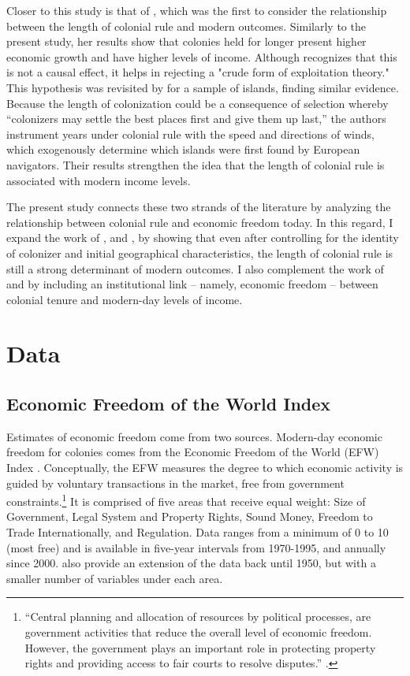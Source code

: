\documentclass[a4paper,12pt]{article}
\begin{document}
Closer to this study is that of \cite{grier1999colonial}, which was the first to consider the relationship between the length of colonial rule and modern outcomes. Similarly to the present study, her results show that colonies held for longer present higher economic growth and have higher levels of income. Although \cite{grier1999colonial} recognizes that this is not a causal effect, it helps in rejecting a "crude form of exploitation theory." This hypothesis was revisited by \cite{feyrer2009colonialism} for a sample of islands, finding similar evidence. Because the length of colonization could be a consequence of selection whereby ``colonizers may settle the best places first and give them up last,'' the authors instrument years under colonial rule with the speed and directions of winds, which exogenously determine which islands were first found by European navigators. Their results strengthen the idea that the length of colonial rule is associated with modern income levels.

The present study connects these two strands of the literature by analyzing the relationship between colonial rule and economic freedom today. In this regard, I expand the work of \cite{laporta1997legal,laporta1998law,laporta2008economic}, and \cite{engermansokoloff1997}, by showing that even after controlling for the identity of colonizer and initial geographical characteristics, the length of colonial rule is still a strong determinant of modern outcomes. I also complement the work of \cite{grier1999colonial} and \cite{feyrer2009colonialism} by including an institutional link -- namely, economic freedom -- between colonial tenure and modern-day levels of income.

\section{Data}

\subsection{Economic Freedom of the World Index}
\label{sec:efwdata}

Estimates of economic freedom come from two sources. Modern-day economic freedom for colonies comes from the Economic Freedom of the World (EFW) Index \citep{EFW_2021}. Conceptually, the EFW  measures the degree to which economic activity is guided by voluntary transactions in the market, free from government constraints.\footnote{``Central planning and allocation of resources by political processes, are government activities that reduce the overall level of economic freedom. However, the government plays an important role in protecting property rights and providing access to fair courts to resolve disputes.'' \citep[p. 1]{EFW_2021}.} It is comprised of five areas that receive equal weight: Size of Government, Legal System and Property Rights, Sound Money, Freedom to Trade Internationally, and Regulation. Data ranges from a minimum of 0 to 10 (most free) and is available in five-year intervals from 1970-1995, and annually since 2000. \cite{murphy2018extending} also provide an extension of the data back until 1950, but with a smaller number of variables under each area.
\end{document}

